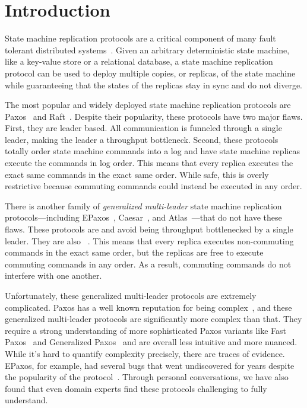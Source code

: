 \section{Introduction}
State machine replication protocols are a critical component of many fault
tolerant distributed systems~\cite{burrows2006chubby, corbett2013spanner,
thomson2012calvin, baker2011megastore, taft2020cockroachdb}. Given an arbitrary
deterministic state machine, like a key-value store or a relational database, a
state machine replication protocol can be used to deploy multiple copies, or
replicas, of the state machine while guaranteeing that the states of the
replicas stay in sync and do not diverge.

The most popular and widely deployed state machine replication protocols are
Paxos~\cite{lamport1998part, burrows2006chubby, corbett2013spanner} and
Raft~\cite{ongaro2014search, taft2020cockroachdb, tidb2019website,
yugabyte2019website}. Despite their popularity, these protocols have two major
flaws. First, they are leader based. All communication is funneled through a
single leader, making the leader a throughput bottleneck. Second, these
protocols totally order state machine commands into a log and have state
machine replicas execute the commands in log order. This means that every
replica executes the exact same commands in the exact same order. While safe,
this is overly restrictive because commuting commands could instead be executed
in any order.

There is another family of \emph{generalized multi-leader} state machine
replication protocols---including EPaxos~\cite{moraru2013there},
Caesar~\cite{arun2017speeding}, and Atlas~\cite{enes2020state}---that do not
have these flaws. These protocols are  and avoid being
throughput bottlenecked by a single leader. They are also
~\cite{lamport2005generalized, losa2016brief}. This means
that every replica executes non-commuting commands in the exact same order, but
the replicas are free to execute commuting commands in any order. As a result,
commuting commands do not interfere with one another.

Unfortunately, these generalized multi-leader protocols are extremely
complicated. Paxos has a well known reputation for being
complex~\cite{lamport2001paxos, van2015paxos, ongaro2014search}, and these
generalized multi-leader protocols are significantly more complex than that.
They require a strong understanding of more sophisticated Paxos variants like
Fast Paxos~\cite{lamport2006fast} and Generalized
Paxos~\cite{lamport2005generalized} and are overall less intuitive and more
nuanced. While it's hard to quantify complexity precisely, there are traces of
evidence. EPaxos, for example, had several bugs that went undiscovered for
years despite the popularity of the protocol~\cite{sutra2011fast}. Through
personal conversations, we have also found that even domain experts find these
protocols challenging to fully understand.

